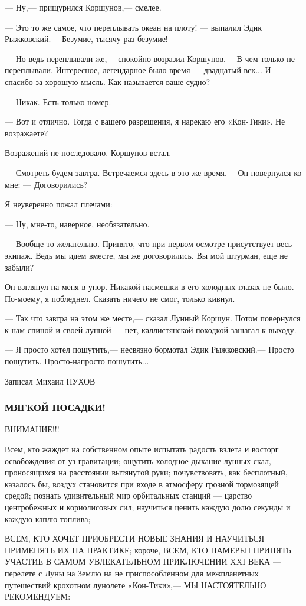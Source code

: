 \documentclass[11pt,a4paper,oneside]{article}
\begin{document}
— Ну,— прищурился Коршунов,— смелее.

— Это то же самое, что переплывать океан на плоту! — выпалил Эдик Рыжковский.— Безумие, тысячу раз безумие!

— Но ведь переплывали же,— спокойно возразил Коршунов.— В чем только не переплывали. Интересное, легендарное было время — двадцатый век... И спасибо за хорошую мысль. Как называется ваше судно?

— Никак. Есть только номер.

— Вот и отлично. Тогда с вашего разрешения, я нарекаю его «Кон-Тики». Не возражаете?

Возражений не последовало. Коршунов встал.

— Смотреть будем завтра. Встречаемся здесь в это же время.— Он повернулся ко мне: — Договорились?

Я неуверенно пожал плечами:

— Ну, мне-то, наверное, необязательно.

— Вообще-то желательно. Принято, что при первом осмотре присутствует весь экипаж. Ведь мы идем вместе, мы же договорились. Вы мой штурман, еще не забыли?

Он взглянул на меня в упор. Никакой насмешки в его холодных глазах не было. По-моему, я побледнел. Сказать ничего не смог, только кивнул.

— Так что завтра на этом же месте,— сказал Лунный Коршун. Потом повернулся к нам спиной и своей лунной — нет, каллистянской походкой зашагал к выходу.

— Я просто хотел пошутить,— несвязно бормотал Эдик Рыжковский.— Просто пошутить. Просто-напросто пошутить...

Записал Михаил ПУХОВ

\subsubsection{МЯГКОЙ ПОСАДКИ!}

ВНИМАНИЕ!!!

Всем, кто жаждет на собственном опыте испытать радость взлета и восторг освобождения от уз гравитации;
ощутить холодное дыхание лунных скал, проносящихся на расстоянии вытянутой руки;
почувствовать, как бесплотный, казалось бы, воздух становится при входе в атмосферу грозной тормозящей средой;
познать удивительный мир орбитальных станций — царство центробежных и кориолисовых сил;
научиться ценить каждую долю секунды и каждую каплю топлива;

ВСЕМ, КТО ХОЧЕТ ПРИОБРЕСТИ НОВЫЕ ЗНАНИЯ И НАУЧИТЬСЯ ПРИМЕНЯТЬ ИХ НА ПРАКТИКЕ;
короче, ВСЕМ, КТО НАМЕРЕН ПРИНЯТЬ УЧАСТИЕ В САМОМ УВЛЕКАТЕЛЬНОМ ПРИКЛЮЧЕНИИ XXI ВЕКА — перелете с Луны на Землю на не приспособленном для межпланетных путешествий крохотном лунолете «Кон-Тики»,— МЫ НАСТОЯТЕЛЬНО РЕКОМЕНДУЕМ:
\end{document}
